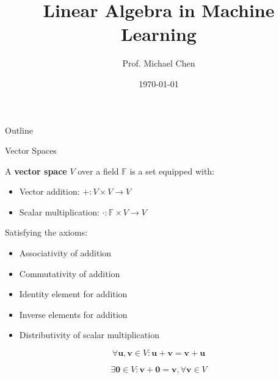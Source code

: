 \documentclass[11pt,16:9]{beamer}
\title{Linear Algebra in Machine Learning}
\author{Prof. Michael Chen}
\date{\today}
\begin{document}
\begin{frame}
    \titlepage
\end{frame}


\begin{frame}{Outline}
    \tableofcontents
\end{frame}



\begin{frame}{Vector Spaces}

            A \textbf{vector space} $V$ over a field $\mathbb{F}$ is a set equipped with:
            
\begin{itemize}
  \item Vector addition: $+: V \times V \rightarrow V$
  \item Scalar multiplication: $\cdot: \mathbb{F} \times V \rightarrow V$
\end{itemize}
            
            Satisfying the axioms:
\begin{itemize}
  \item Associativity of addition
  \item Commutativity of addition
  \item Identity element for addition
  \item Inverse elements for addition
  \item Distributivity of scalar multiplication
\end{itemize}
            

\begin{equation}
\forall \mathbf{u}, \mathbf{v} \in V: \mathbf{u} + \mathbf{v} = \mathbf{v} + \mathbf{u}
\end{equation}

\begin{equation}
\exists \mathbf{0} \in V: \mathbf{v} + \mathbf{0} = \mathbf{v}, \forall \mathbf{v} \in V
\end{equation}

\end{frame}
\end{document}

